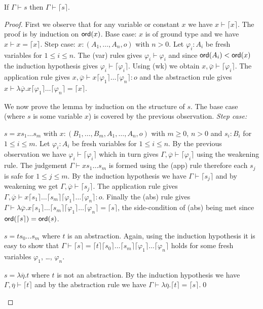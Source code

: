 \documentclass{llncs}
\newcommand{\elnf}[1]{\lceil #1\rceil} %
\begin{document}
\begin{lemma}
\label{lem:elnf_preserves_safety}
If $\Gamma \vdash s$ then $\Gamma \vdash \elnf{s}$.
\end{lemma}
\begin{proof}

  First we observe that for any variable or constant $x$ we have $x
  \vdash \elnf{x}$. The proof is by induction on ${\sf ord}(x)$. Base case:
  $x$ is of ground type and we have $x \vdash x = \elnf{x}$. Step
  case: $x:(A_1, \ldots, A_n,o)$ with $n>0$. Let $\varphi_i:A_i$ be
  fresh variables for $1\leq i\leq n$. The (var) rules gives
  $\varphi_i \vdash \varphi_i$ and since ${\sf ord}(A_i) < {\sf ord}(x)$ the
  induction hypothesis gives $\varphi_i \vdash
  \elnf{\varphi_i}$. Using (wk) we obtain $x, \overline{\varphi}
  \vdash \elnf{\varphi_i}$.  The application rule gives $x,
  \overline{\varphi} \vdash x \elnf{\varphi_1} \ldots \elnf{\varphi_n}
  : o$ and the abstraction rule gives $ x \vdash \lambda
  \overline{\varphi} . x \elnf{\varphi_1} \ldots \elnf{\varphi_n} =
  \elnf{x}$.


We now prove the lemma by induction on the structure of $s$.
The base case (where $s$ is some variable $x$) is covered by the previous observation.
\emph{Step case:}
\begin{compactitem}
\item $s = x s_1 \ldots s_m$ with $x: (B_1, \ldots, B_m, A_1, \ldots, A_n, o)$ with $m\geq 0$, $n>0$ and $s_i : B_i$ for $1 \leq i \leq m$.
Let $\varphi_i: A_i$ be fresh variables for $1\leq i \leq n$. By the previous observation we have $\varphi_i \vdash \elnf{\varphi_i}$ which in turn gives $\Gamma , \overline{\varphi} \vdash \elnf{\varphi_i}$ using the weakening rule.
The judgement $\Gamma \vdash x s_1 \ldots s_m$ is formed using the (app) rule therefore each $s_j$ is safe for $1\leq j \leq m$. By the induction hypothesis we have $\Gamma \vdash \elnf{s_j}$ and by weakening we get $\Gamma, \overline{\varphi} \vdash \elnf{s_j}$.
The application rule gives $\Gamma, \overline{\varphi} \vdash
x \elnf{s_1} \ldots \elnf{s_m} \elnf{\varphi_1} \ldots \elnf{\varphi_n} : o$. Finally the (abs) rule gives $\Gamma \vdash \lambda \overline{\varphi} . x \elnf{s_1} \ldots \elnf{s_m}  \elnf{\varphi_1} \ldots \elnf{\varphi_n} = \elnf{s}$, the side-condition of (abs) being met since $\ord{\elnf{s}} = \ord{s}$.


\item $s = t s_0 \ldots s_m$ where $t$ is an abstraction. Again, using the induction hypothesis it is easy to show that $\Gamma \vdash \elnf{s} = \elnf{t} \elnf{s_0} \ldots \elnf{s_m} \elnf{\varphi_1} \ldots \elnf{\varphi_n}$ holds for some fresh variables $\varphi_1$, \ldots, $\varphi_n$.

\item $s = \lambda \overline{\eta} . t$ where $t$ is not an abstraction. By the induction hypothesis we have $\Gamma, \overline{\eta} \vdash \elnf{t}$ and by the abstraction rule we have $\Gamma \vdash \lambda \overline{\eta} . \elnf{t} = \elnf{s}$.\qed
\end{compactitem}
\end{proof}
\end{document}
